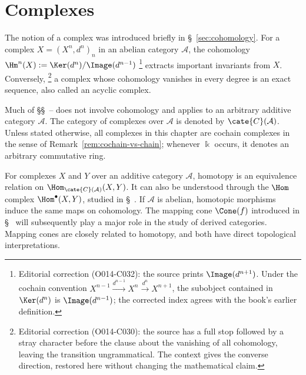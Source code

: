 
\chapter{Complexes}\label{sec:cplx}
\hypertarget{o014.aljabr2.chapter3.overview}{ }

The notion of a complex was introduced briefly in \S~\ref{sec:cohomology}.
For a complex $X=(X^n,d^n)_n$ in an abelian category $\mathcal{A}$, the
cohomology
$\Hm^n(X):=\Ker(d^n)/\Image(d^{n-1})$%
\footnote{Editorial correction (O014-C032): the source prints
$\Image(d^{n+1})$. Under the cochain convention
$X^{n-1}\xrightarrow{d^{n-1}}X^n\xrightarrow{d^n}X^{n+1}$, the subobject
contained in $\Ker(d^n)$ is $\Image(d^{n-1})$; the corrected index agrees
with the book's earlier definition.}
extracts important invariants from $X$. Conversely,%
\footnote{Editorial correction (O014-C030): the source has a full stop
followed by a stray character before the clause about the vanishing of all
cohomology, leaving the transition ungrammatical. The context gives the
converse direction, restored here without changing the mathematical claim.}
a complex whose cohomology vanishes in every degree is an exact sequence,
also called an acyclic complex.

Much of \S\S~--%
 does not involve cohomology and applies
to an arbitrary additive category $\mathcal{A}$. The category of complexes
over $\mathcal{A}$ is denoted by $\cate{C}(\mathcal{A})$. Unless stated
otherwise, all complexes in this chapter are cochain complexes in the sense
of Remark~\ref{rem:cochain-vs-chain}; whenever $\Bbbk$ occurs, it denotes an
arbitrary commutative ring.

For complexes $X$ and $Y$ over an additive category $\mathcal{A}$, homotopy
is an equivalence relation on
$\Hom_{\cate{C}(\mathcal{A})}(X,Y)$. It can also be understood through the
$\Hom$ complex $\Hom^\bullet(X,Y)$, studied in
\S~. If $\mathcal{A}$ is abelian,
homotopic morphisms induce the same maps on cohomology. The mapping cone
$\Cone(f)$ introduced in \S~ will
subsequently play a major role in the study of derived categories. Mapping
cones are closely related to homotopy, and both have direct topological
interpretations.

